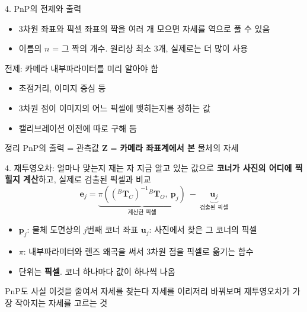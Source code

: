 \documentclass[aspectratio=169,11pt]{beamer}
\newcommand{\T}[3][]{{}^{#2}\mathbf{T}^{#1}_{#3}}   %
\begin{document}
\begin{frame}{4. PnP의 전제와 출력}
  \begin{itemize}
    \item 3차원 좌표와 픽셀 좌표의 짝을 여러 개 모으면 자세를 역으로 풀 수 있음
    \item 이름의 $n$ = 그 짝의 개수. 원리상 최소 $3$개, 실제로는 더 많이 사용
  \end{itemize}
  \vfill
  \begin{block}{전제: 카메라 내부파라미터를 미리 알아야 함}
    \begin{itemize}
      \item 초점거리, 이미지 중심 등
      \item 3차원 점이 이미지의 어느 픽셀에 맺히는지를 정하는 값
      \item 캘리브레이션 이전에 따로 구해 둠
    \end{itemize}
  \end{block}
  \vfill
  \begin{alertblock}{정리}
    PnP의 출력 = 관측값 $\mathbf{Z}$ = \textbf{카메라 좌표계에서 본} 물체의 자세
  \end{alertblock}
\end{frame}

\begin{frame}{4. 재투영오차: 얼마나 맞는지 재는 자}
  지금 알고 있는 값으로 \textbf{코너가 사진의 어디에 찍힐지 계산}하고,
  실제로 검출된 픽셀과 비교
  \[
    \mathbf{e}_j
    =
    \underbrace{
      \pi\!\left(\left(\T{B}{C}\right)^{-1}\T{B}{O},\ \mathbf{p}_j\right)
    }_{\text{계산한 픽셀}}
    \ -\
    \underbrace{\mathbf{u}_j}_{\text{검출된 픽셀}}
  \]
  \begin{itemize}
    \item $\mathbf{p}_j$: 물체 도면상의 $j$번째 코너 좌표
      \quad $\mathbf{u}_j$: 사진에서 찾은 그 코너의 픽셀
    \item $\pi$: 내부파라미터와 렌즈 왜곡을 써서 $3$차원 점을 픽셀로 옮기는 함수
    \item 단위는 \textbf{픽셀}. 코너 하나마다 값이 하나씩 나옴
  \end{itemize}
  \vfill
  \begin{block}{PnP도 사실 이것을 줄여서 자세를 찾는다}
    자세를 이리저리 바꿔보며 재투영오차가 가장 작아지는 자세를 고르는 것
  \end{block}
\end{frame}
\end{document}
